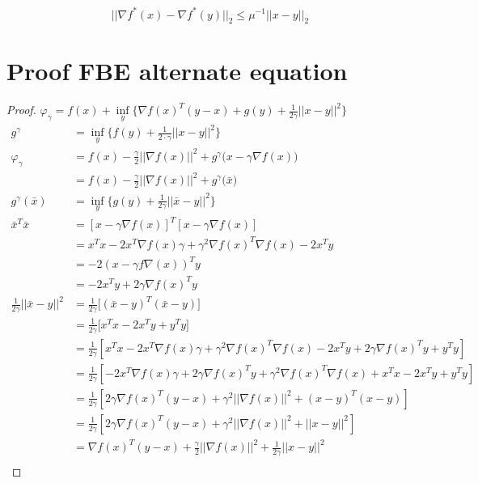 		\begin{equation}
			|| \nabla f^*(x) - \nabla f^*(y) ||_2 \leq \mu^{-1} ||x-y||_2
			\label{eq:appendix f lip}
		\end{equation}
		
\chapter{Proof FBE alternate equation}

\begin{proof}
	$\varphi_{\gamma} =   f(x) + \underset{y}{\inf} \Big\{ \nabla f(x)^T(y-x) + g(y) + \frac{1}{2 \gamma} ||x-y||^2  \Big\} $
	\begin{align*}
	g^{\gamma} 	&=  \underset{y}{\inf} \big \{f(y)+\frac{1}{2 \cdot \gamma}||x-y||^2 \big \} \\
	\varphi_{\gamma} 
	&= f(x) - \frac{\gamma}{2}||\nabla f(x)||^2 + g^{\gamma} \big(x-\gamma \nabla f(x) \big) \\
	&= f(x) - \frac{\gamma}{2}||\nabla f(x)||^2 + g^{\gamma} \big(\bar{x} \big)\\
	g^{\gamma} (\bar{x})
	&=\underset{y}{\inf} \Big\{g(y)+\frac{1}{2 \gamma}||\bar{x}-y||^2 \Big\}	\\
	\bar{x}^T\bar{x}
	&=[x- \gamma \nabla f(x)]^T[x- \gamma \nabla f(x)] \\
	&= x^Tx -2x^T\nabla f(x) \gamma + \gamma^2 \nabla f(x)^T\nabla f(x)-2x^Ty \\
	&=-2(x-\gamma f\nabla(x))^Ty\\
	&=-2x^Ty + 2\gamma \nabla f(x)^Ty \\
	\frac{1}{2 \gamma}||\bar{x}-y||^2
	&=\frac{1}{2 \gamma} \Big [ (\bar{x}-y)^T(\bar{x}-y) \Big]\\
	&=\frac{1}{2 \gamma} \Big [ x^Tx - 2 x^Ty + y^Ty \Big]\\
	& =\frac{1}{2 \gamma}[x^Tx-2x^T\nabla f(x) \gamma + \gamma^2 \nabla f(x)^T\nabla f(x) -2x^Ty + 2\gamma \nabla f(x)^Ty +y^Ty] \\
	& = \frac{1}{2 \gamma}[-2x^T\nabla f(x) \gamma  + 2\gamma \nabla f(x)^Ty + \gamma^2 \nabla f(x)^T\nabla f(x) +x^Tx -2x^Ty +y^Ty]\\
	&= \frac{1}{2 \gamma}[ 2\gamma \nabla f(x)^T(y-x) + \gamma^2||\nabla f(x)||^2 + (x-y)^T(x-y)]\\
	&= \frac{1}{2 \gamma}[ 2\gamma \nabla f(x)^T(y-x) + \gamma^2||\nabla f(x)||^2 + ||x-y||^2] \\
	&=  \nabla f(x)^T(y-x) +\frac{\gamma}{2}||\nabla f(x)||^2 + \frac{1}{2 \gamma} ||x-y||^2 \\

\end{align*}
\end{proof}
